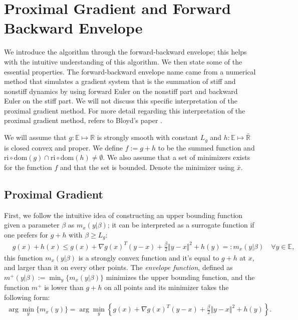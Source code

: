 \documentclass[]{article}
\theoremstyle{definition}
\begin{document}
\section{Proximal Gradient and Forward Backward Envelope}\label{sec:pg_forward_backward_env}
    We introduce the algorithm through the forward-backward envelope; this helps with the intuitive understanding of this algorithm. We then state some of the essential properties. The forward-backward envelope name came from a numerical method that simulates a gradient system that is the summation of stiff and nonstiff dynamics by using forward Euler on the nonstiff part and backward Euler on the stiff part. We will not discuss this specific interpretation of the proximal gradient method. For more detail regarding this interpretation of the proximal gradient method, refers to Bloyd's paper \cite{paper:bloyd}. 
    \begin{assumption}\label{assumption:1}
        We will assume that $g:\mathbb E\mapsto \mathbb R$ is strongly smooth with constant $L_g$ and $h:\mathbb E \mapsto \bar{\mathbb R}$ is closed convex and proper. We define $f := g + h$ to be the summed function and $\text{ri}\circ \text{dom}(g) \cap \text{ri}\circ \text{dom}(h) \neq \emptyset$. We also assume that a set of minimizers exists for the function $f$ and that the set is bounded. Denote the minimizer using $\bar x$. 
    \end{assumption}
    
    \subsection{Proximal Gradient}
        First, we follow the intuitive idea of constructing an upper bounding function given a parameter $\beta$ as  $m_x(y|\beta)$; it can be interpreted as a surrogate function if one prefers for $g + h$ with $\beta \ge L_g$: 
        \begin{align*}
            & g(x) + h(x) \le 
            g(x) + \nabla g(x)^T(y - x) + \frac{\beta}{2} \Vert y - x\Vert^2
            + h(y) =: m_x(y|\beta) \quad \forall y \in \mathbb E, 
        \end{align*}
        this function $m_x(y|\beta)$ is a strongly convex function and it's equal to $g + h$ at $x$, and larger than it on every other points. The \emph{envelope function}, defined as $m^+(y|\beta):= \min_y \{m_x(y|\beta)\}$ minimizes the upper bounding function, and the function $m^+$ is lower than $g + h$ on all points and its minimizer takes the following form: 
        \begin{align*}
            \arg\min_{y} \{m_x(y)\} 
            = \arg\min_{y}\left\lbrace
                g(x) + \nabla g(x)^T(y - x) + \frac{\beta}{2}
                \Vert y - x\Vert^2 + h(y) 
            \right\rbrace. 
        \end{align*}
        
\end{document}
